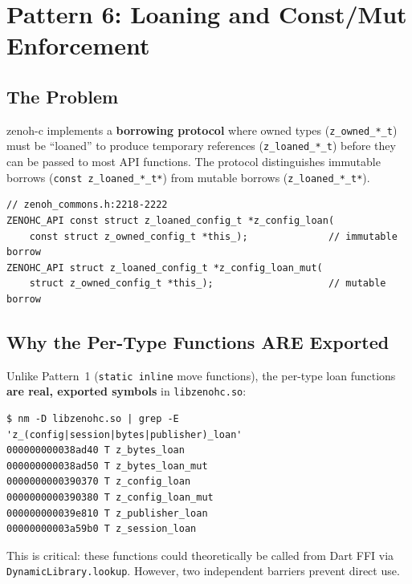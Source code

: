 \documentclass[11pt,a4paper]{article}
\newcommand{\code}[1]{\texttt{#1}}
\newcommand{\file}[1]{\texttt{#1}}
\newcommand{\fn}[1]{\texttt{#1}}
\begin{document}
\section{Pattern 6: Loaning and Const/Mut Enforcement}
\label{sec:pattern6}

\subsection{The Problem}

zenoh-c implements a \textbf{borrowing protocol} where owned types
(\code{z\_owned\_*\_t}) must be ``loaned'' to produce temporary
references (\code{z\_loaned\_*\_t}) before they can be passed to
most API functions. The protocol distinguishes immutable borrows
(\code{const z\_loaned\_*\_t*}) from mutable borrows
(\code{z\_loaned\_*\_t*}).

\begin{lstlisting}[style=cstyle,caption={Loan function pair from zenoh\_commons.h}]
// zenoh_commons.h:2218-2222
ZENOHC_API const struct z_loaned_config_t *z_config_loan(
    const struct z_owned_config_t *this_);              // immutable borrow
ZENOHC_API struct z_loaned_config_t *z_config_loan_mut(
    struct z_owned_config_t *this_);                    // mutable borrow
\end{lstlisting}

\subsection{Why the Per-Type Functions ARE Exported}

Unlike Pattern~1 (\code{static inline} move functions), the per-type loan
functions \textbf{are real, exported symbols} in \file{libzenohc.so}:

\begin{lstlisting}[style=shellstyle,basicstyle=\ttfamily\footnotesize\color{shellForeground}]
$ nm -D libzenohc.so | grep -E 'z_(config|session|bytes|publisher)_loan'
000000000038ad40 T z_bytes_loan
000000000038ad50 T z_bytes_loan_mut
0000000000390370 T z_config_loan
0000000000390380 T z_config_loan_mut
000000000039e810 T z_publisher_loan
00000000003a59b0 T z_session_loan
\end{lstlisting}

This is critical: these functions could theoretically be called from Dart
FFI via \fn{DynamicLibrary.lookup}. However, two independent barriers
prevent direct use.
\end{document}
